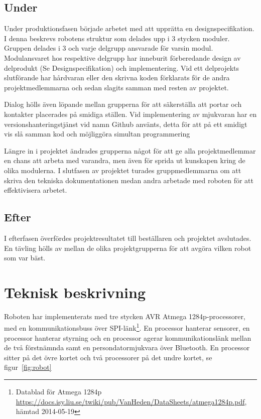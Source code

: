 \documentclass[a4paper,12pt,fleqn]{article}
\begin{document}
\subsection{Under}
Under produktionsfasen började arbetet med att upprätta en designspecifikation. I denna beskrevs robotens struktur som delades upp i 3 stycken moduler. Gruppen delades i 3 och varje delgrupp ansvarade för varsin modul. Modulansvaret hos respektive delgrupp har inneburit förberedande design av delprodukt (Se Designspecifikation) och implementering. 
Vid ett delprojekts slutförande har hårdvaran eller den skrivna koden förklarats för de andra projektmedlemmarna och sedan slagits samman med resten av projektet. 

Dialog hölls även löpande mellan grupperna för att säkerställa att portar och kontakter placerades på smidiga ställen. Vid implementering av mjukvaran har en versionshanteringstjänst vid namn Github använts, detta för att på ett smidigt vis slå samman kod och möjliggöra simultan programmering

Längre in i projektet ändrades grupperna något för att ge alla projektmedlemmar en chans att arbeta med varandra, men även för sprida ut kunskapen kring de olika modulerna.
I slutfasen av projektet turades gruppmedlemmarna om att skriva den tekniska dokumentationen medan andra arbetade med roboten för att effektivisera arbetet.

\subsection{Efter}
I efterfasen överfördes projektresultatet till beställaren och projektet avslutades. En tävling hölls av mellan de olika projektgrupperna för att avgöra vilken robot som var bäst. 

\section{Teknisk beskrivning}
Roboten har implementerats med tre stycken AVR Atmega 1284p-processorer, med en kommunikationsbuss över SPI-länk\footnote{Datablad för Atmega 1284p \url{https://docs.isy.liu.se/twiki/pub/VanHeden/DataSheets/atmega1284p.pdf}, hämtad 2014-05-19}. En processor hanterar sensorer, en processor hanterar styrning och en processor agerar kommunikationslänk mellan de två förstnämnda samt en persondatormjukvara över Bluetooth. En processor sitter på det övre kortet och två processorer på det undre kortet, se figur~\ref{fig:robot}
\end{document}
